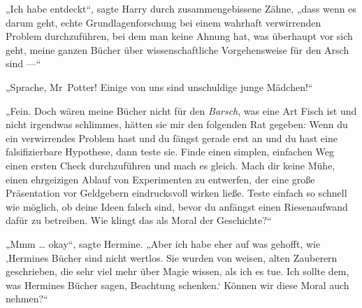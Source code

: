 „Ich habe entdeckt“, sagte Harry durch zusammengebissene Zähne, „dass wenn es darum geht, echte Grundlagenforschung bei einem wahrhaft verwirrenden Problem durchzuführen, bei dem man keine Ahnung hat, was überhaupt vor sich geht, meine ganzen Bücher über wissenschaftliche Vorgehensweise für den Arsch sind —“

„Sprache, Mr~Potter! Einige von uns sind unschuldige junge Mädchen!“

„Fein. Doch wären meine Bücher nicht für den \emph{Barsch}, was eine Art Fisch ist und nicht irgendwas schlimmes, hätten sie mir den folgenden Rat gegeben: Wenn du ein verwirrendes Problem hast und du fängst gerade erst an und du hast eine falsifizierbare Hypothese, dann teste sie. Finde einen simplen, einfachen Weg einen ersten Check durchzuführen und mach es gleich. Mach dir keine Mühe, einen ehrgeizigen Ablauf von Experimenten zu entwerfen, der eine große Präsentation vor Geldgebern eindrucksvoll wirken ließe. Teste einfach so schnell wie möglich, ob deine Ideen falsch sind, bevor du anfängst einen Riesenaufwand dafür zu betreiben. Wie klingt das als Moral der Geschichte?“

„Mmm … okay“, sagte Hermine.
„Aber ich habe eher auf was gehofft, wie ‚Hermines Bücher sind nicht wertlos. Sie wurden von weisen, alten Zauberern geschrieben, die sehr viel mehr über Magie wissen, als ich es tue. Ich sollte dem, was Hermines Bücher sagen, Beachtung schenken.‘ Können wir diese Moral auch nehmen?“

